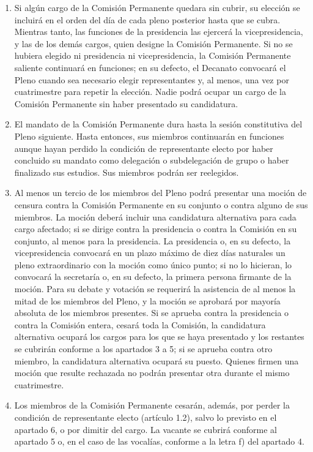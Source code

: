 \documentclass[11pt,a4paper]{article}
\begin{document}
\begin{enumerate}
\begin{enumerate}
  \end{enumerate}
\item Si algún cargo de la Comisión Permanente quedara sin cubrir, su elección se incluirá en el orden del día de cada pleno posterior hasta que se cubra. Mientras tanto, las funciones de la presidencia las ejercerá la vicepresidencia, y las de los demás cargos, quien designe la Comisión Permanente. Si no se hubiera elegido ni presidencia ni vicepresidencia, la Comisión Permanente saliente continuará en funciones; en su defecto, el Decanato convocará el Pleno cuando sea necesario elegir representantes y, al menos, una vez por cuatrimestre para repetir la elección. Nadie podrá ocupar un cargo de la Comisión Permanente sin haber presentado su candidatura.
\item El mandato de la Comisión Permanente dura hasta la sesión constitutiva del Pleno siguiente. Hasta entonces, sus miembros continuarán en funciones aunque hayan perdido la condición de representante electo por haber concluido su mandato como delegación o subdelegación de grupo o haber finalizado sus estudios. Sus miembros podrán ser reelegidos.
\item Al menos un tercio de los miembros del Pleno podrá presentar una moción de censura contra la Comisión Permanente en su conjunto o contra alguno de sus miembros. La moción deberá incluir una candidatura alternativa para cada cargo afectado; si se dirige contra la presidencia o contra la Comisión en su conjunto, al menos para la presidencia. La presidencia o, en su defecto, la vicepresidencia convocará en un plazo máximo de diez días naturales un pleno extraordinario con la moción como único punto; si no lo hicieran, lo convocará la secretaría o, en su defecto, la primera persona firmante de la moción. Para su debate y votación se requerirá la asistencia de al menos la mitad de los miembros del Pleno, y la moción se aprobará por mayoría absoluta de los miembros presentes. Si se aprueba contra la presidencia o contra la Comisión entera, cesará toda la Comisión, la candidatura alternativa ocupará los cargos para los que se haya presentado y los restantes se cubrirán conforme a los apartados 3 a 5; si se aprueba contra otro miembro, la candidatura alternativa ocupará su puesto. Quienes firmen una moción que resulte rechazada no podrán presentar otra durante el mismo cuatrimestre.
\item Los miembros de la Comisión Permanente cesarán, además, por perder la condición de representante electo (artículo 1.2), salvo lo previsto en el apartado 6, o por dimitir del cargo. La vacante se cubrirá conforme al apartado 5 o, en el caso de las vocalías, conforme a la letra f) del apartado 4.
\end{enumerate}
\end{document}
